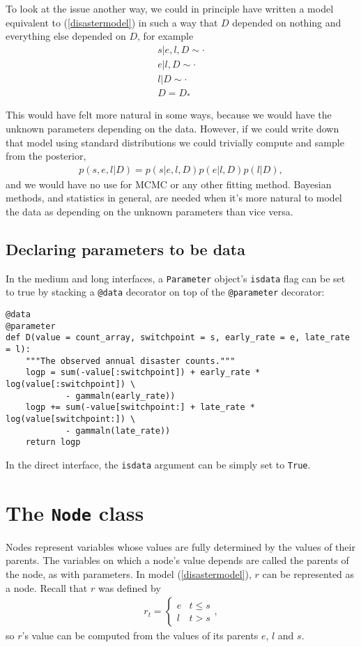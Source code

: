 \medskip
To look at the issue another way, we could in principle have written a model equivalent to (\ref{disastermodel}) in such a way that $D$ depended on nothing and everything else depended on $D$, for example
\begin{eqnarray*}
    s|e,l,D\sim\cdot\\
    e|l,D\sim\cdot\\
    l|D\sim\cdot\\
    D=D_*
\end{eqnarray*}

This would have felt more natural in some ways, because we would have the unknown parameters depending on the data. However, if we could write down that model using standard distributions we could trivially compute and sample from the posterior,
\begin{eqnarray*}
    p(s,e,l|D) = p(s|e, l, D) p(e|l, D) p(l|D),
\end{eqnarray*}
and we would have no use for MCMC or any other fitting method. Bayesian methods, and statistics in general, are needed when it's more natural to model the data as depending on the unknown parameters than vice versa.

\subsection{Declaring parameters to be data}

In the medium and long interfaces, a \texttt{Parameter} object's \texttt{isdata} flag can be set to true by stacking a \texttt{@data} decorator on top of the \texttt{@parameter} decorator:
\begin{verbatim}
@data
@parameter
def D(value = count_array, switchpoint = s, early_rate = e, late_rate = l):
    """The observed annual disaster counts."""
    logp = sum(-value[:switchpoint]) + early_rate * log(value[:switchpoint]) \
            - gammaln(early_rate))
    logp += sum(-value[switchpoint:] + late_rate * log(value[switchpoint:]) \
            - gammaln(late_rate))
    return logp
\end{verbatim}
In the direct interface, the \texttt{isdata} argument can be simply set to \texttt{True}.


\section{The \texttt{Node} class}\label{node}

Nodes represent variables whose values are fully determined by the values of their parents. The variables on which a node's value depends are called the parents of the node, as with parameters. In model (\ref{disastermodel}), $r$ can be represented as a node. Recall that $r$ was defined by
\begin{eqnarray*}
    r_t=\left\{\begin{array}{ll}
        e & t\le s\\ l & t>s
        \end{array}\right.,
\end{eqnarray*}
so $r$'s value can be computed from the values of its parents $e$, $l$ and $s$.


